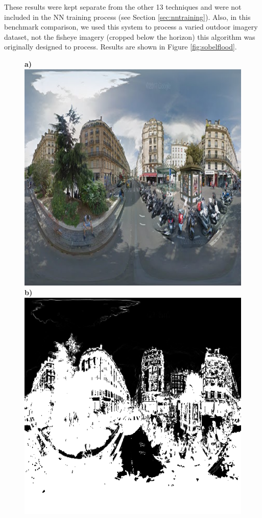 \documentclass[final,3p,times,authoryear]{elsarticle}
\begin{document}
These results were kept separate from the other 13 techniques and were not included in the NN training process (see Section \ref{sec:nntraining}). Also, in this benchmark comparison, we used this system to process a varied outdoor imagery dataset, not the fisheye imagery (cropped below the horizon) this algorithm was originally designed to process. Results are shown in Figure \ref{fig:sobelflood}.



\begin{figure}
\centering    
\textbf{a)}\includegraphics[scale=0.27]{Images/2/FloodfillInput.png}
\textbf{b)}\includegraphics[scale=0.27]{Images/2/FloodfillMiddle.png}

\end{figure}
\end{document}
